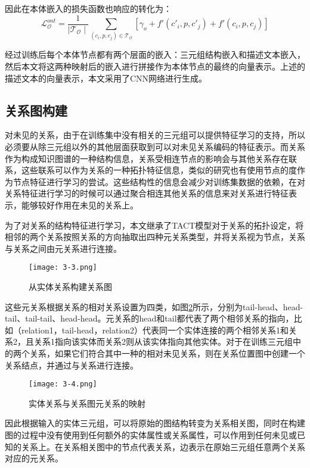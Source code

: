 因此在本体嵌入的损失函数也响应的转化为：
\begin{equation}
  \mathcal{L}_{\mathcal{O}}^{ont} = \frac{1}{\mid \mathcal{T}_{\mathcal{O}}\mid} \sum_{(c_{i},p,c_{j}) \in \mathcal{T}_{\mathcal{O}}} [\gamma _{o} + f'(c'_{i},p,c'_{j}) + f'(c_{i},p,c_{j})] \label{eq:3-7}
\end{equation}

经过训练后每个本体节点都有两个层面的嵌入：三元组结构嵌入和描述文本嵌入，然后本文将这两种映射后的嵌入进行拼接作为本体节点的最终的向量表示。上述的描述文本的向量表示，本文采用了CNN网络进行生成。

\subsection{关系图构建}
对未见的关系，由于在训练集中没有相关的三元组可以提供特征学习的支持，所以必须要从除三元组以外的其他层面获取到可以对未见关系编码的特征表示。而关系作为构成知识图谱的一种结构信息，关系受相连节点的影响会与其他关系存在联系，这些联系可以作为关系的一种拓扑特征信息，类似的研究也有使用节点的度作为节点特征进行学习的尝试。这些结构性的信息会减少对训练集数据的依赖，在对关系特征进行学习的时候可以通过聚合相连其他关系的信息来对关系进行特征表示，能够较好作用在未见的关系上。

为了对关系的结构特征进行学习，本文继承了TACT模型对于关系的拓扑设定，将相邻的两个关系按照关系的方向抽取出四种元关系类型，并将关系视为节点，关系与关系之间由元关系进行连接。
\begin{figure}[h]
  \centering
  \texttt{[image: 3-3.png]}
  \caption{从实体关系构建关系图}
  \label{fig:3-3}
\end{figure}

这些元关系根据关系的相对关系设置为四类，如图\ref{fig:3-4}所示，分别为tail-head、head-tail、tail-tail、head-head。元关系的head和tail都代表了两个相邻关系的指向，比如（relation1，tail-head，relation2）代表同一个实体连接的两个相邻关系1和关系2，且关系1指向该实体而关系2则从该实体指向其他实体。对于在训练三元组中的两个关系，如果它们符合其中一种的相对未见关系，则在关系位置图中创建一个关系结点，并通过与关系进行连接。
\begin{figure}[h]
  \centering
  \texttt{[image: 3-4.png]}
  \caption{实体关系与关系图元关系的映射}
  \label{fig:3-4}
\end{figure}

因此根据输入的实体三元组，可以将原始的图结构转变为关系相关图，同时在构建图的过程中没有使用到任何额外的实体属性或关系属性，可以作用到任何未见或已知的关系上。在关系相关图中的节点代表关系，边表示在原始三元组任意两个关系对应的元关系。

